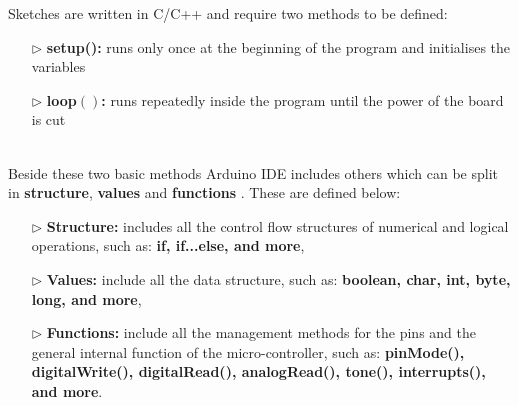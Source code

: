 \documentclass[12pt,a4paper,draft]{report}
\begin{document}
Sketches are written in C/C++ and require two methods to be defined:
\begin{itemize}
    \item[$\triangleright$] \textbf{setup():} runs only once at the beginning of the program and initialises the variables
    \item[$\triangleright$] \textbf{loop$()$:} runs repeatedly inside the program until the power of the board is cut
\end{itemize}
\ \\
Beside these two basic methods Arduino IDE includes others which can be split in \textbf{structure}, \textbf{values} and \textbf{functions} \cite{website:arduinosoftware}. These are defined below: 
\begin{itemize}
    \item[$\triangleright$] \textbf{Structure:} includes all the control flow structures of numerical and logical operations, such as: \textbf{if, if...else, and more}, 
    \item[$\triangleright$] \textbf{Values:} include all the data structure, such as: \textbf{boolean, char, int, byte, long, and more},
    \item[$\triangleright$] \textbf{Functions:} include all the management methods for the pins and the general internal function of the micro-controller, such as: \textbf{pinMode(), digitalWrite(), digitalRead(), analogRead(), tone(), interrupts(), and more}.
\end{itemize}
\ \\
%
\end{document}
